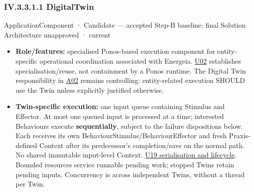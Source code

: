 \subsubsection*{IV.3.3.1.1 DigitalTwin}
\label{navigation:IV.3.3.1.1}

\label{element:3f64d339648246e99e8866c8089f8960}
{\small ApplicationComponent · Candidate — accepted Step-B baseline; final Solution Architecture unapproved · current}\par

\begin{itemize}


\item \textbf{Role/features:} specialised Ponos-based execution component for entity-specific
  operational coordination associated with Energeia. \href{\detokenize{../../../../../../../../../docs/markdown/05-information-systems-architecture/sources.md#u02}}{U02} establishes
  specialisation/reuse, not containment by a Ponos runtime. The Digital Twin
  responsibility in \href{\detokenize{../../../../../../../../../docs/markdown/05-information-systems-architecture/sources.md#a02}}{A02} remains controlling: entity-related
  execution SHOULD use the Twin unless explicitly justified otherwise.

\item \textbf{Twin-specific execution:} one input queue containing Stimulus and Effector.
  At most one queued input is processed at a time; interested Behaviours execute
  \textbf{sequentially}, subject to the failure dispositions below. Each receives its
  own BehaviourStimulus/BehaviourEffector and fresh Praxis-defined Context after
  its predecessor's completion/save on the normal path. No shared immutable
  input-level Context.
  \href{\detokenize{../../../../../../../../../docs/markdown/05-information-systems-architecture/design-notes/DesignNote-Digital-Twin-Behaviour-and-Execution-Semantics.md}}{U19 serialisation and lifecycle}.
  Bounded resources service runnable pending work; stopped Twins retain pending
  inputs. Concurrency is across independent Twins, without a thread per Twin.


\end{itemize}
